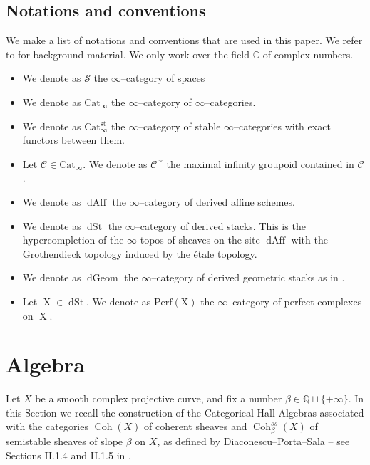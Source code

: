 \documentclass[11pt]{article}
\newcommand{\BC}{\mathbb{C}}
\newcommand{\BQ}{\mathbb{Q}}
\newcommand{\coh}{\operatorname{Coh}}
\begin{document}
\subsection{Notations and conventions}
We make a list of notations and conventions that are used in this paper. We refer to \cite{lurie2008highertopostheory} for background material. We only work over the field $\BC$ of complex numbers.

\begin{itemize}
\item We denote as $\mathcal{S}$ the $\infty$--category of spaces
\item We denote as $\operatorname{Cat_{\infty}}$ the $\infty$--category of $\infty$--categories.
\item We denote as $\operatorname{Cat^{st}_{\infty}}$ the $\infty$--category of stable $\infty$--categories with exact functors between them.
\item Let $\mathcal{C}\in\operatorname{Cat_{\infty}}$. We denote as $\mathcal{C}^{\simeq}$ the maximal infinity groupoid contained in $\mathcal{C}$.
\item We denote as $\operatorname{dAff}$ the $\infty$--category of derived affine schemes.
\item We denote as $\operatorname{dSt}$ the $\infty$--category of derived stacks. This is the hypercompletion of the $\infty$ topos of sheaves on the site $\operatorname{dAff}$ with the Grothendieck topology induced by the étale  topology. 
\item We denote as $\operatorname{dGeom}$ the $\infty$--category of derived geometric stacks as in \cite{porta2016higheranalyticstacksgaga}.
\item Let $\operatorname{X} \in \operatorname{dSt}$. We denote as $\operatorname{Perf(X)}$ the $\infty$--category of perfect complexes on $\operatorname{X}$.
\end{itemize}


\section{Algebra}\label{sec : algebra}
Let $X$ be a smooth complex projective curve, and fix a number $\beta \in \BQ \sqcup\{+\infty\}$. In this Section we recall the construction of the Categorical Hall Algebras associated with the categories $\coh(X)$ of coherent sheaves and $\coh_{\beta}^{ss}(X)$ of semistable sheaves of slope $\beta$ on $X$, as defined by Diaconescu--Porta--Sala -- see Sections II.1.4 and II.1.5 in \cite{dps}.
\end{document}

